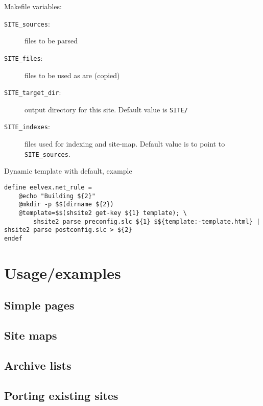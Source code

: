 \documentclass{memoir}
\begin{document}
Makefile variables:
\begin{description}
\item[\texttt{SITE\_sources}:] files to be parsed
\item[\texttt{SITE\_files}:] files to be used as are (copied)
\item[\texttt{SITE\_target\_dir}:] output directory for this site. Default value is \texttt{SITE/}
\item[\texttt{SITE\_indexes}:] files used for indexing and site-map. Default value is to point to \texttt{SITE\_sources}.
\end{description}

Dynamic template with default, example
\tabson
\begin{verbatim}
define eelvex.net_rule =
	@echo "Building ${2}"
	@mkdir -p $$(dirname ${2})
	@template=$$(shsite2 get-key ${1} template); \
		shsite2 parse preconfig.slc ${1} $${template:-template.html} | shsite2 parse postconfig.slc > ${2}
endef
\end{verbatim}





\chapter{Usage/examples} %

	\section{Simple pages} %


	\section{Site maps} %


	\section{Archive lists} %


	\section{Porting existing sites} %


\end{document}
